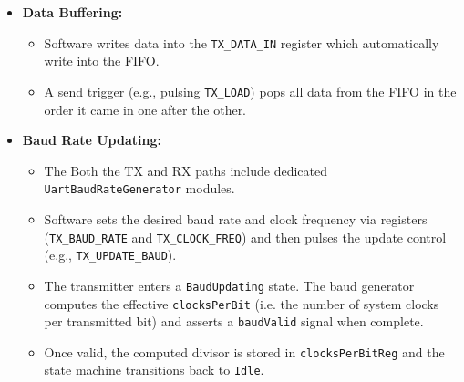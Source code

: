 \begin{itemize}
    \item \textbf{Data Buffering:} 
    \begin{itemize}
        \item Software writes data into the \texttt{TX\_DATA\_IN} register which automatically write into the FIFO.
        \item A send trigger (e.g., pulsing \texttt{TX\_LOAD}) pops all data from the FIFO in the order it came in one after the other.
    \end{itemize}
    
    \item \textbf{Baud Rate Updating:}
    \begin{itemize}
        \item The Both the TX and RX paths include dedicated \texttt{UartBaudRateGenerator} modules.
        \item Software sets the desired baud rate and clock frequency via registers (\texttt{TX\_BAUD\_RATE} and \texttt{TX\_CLOCK\_FREQ}) and then pulses the update control (e.g., \texttt{TX\_UPDATE\_BAUD}).
        \item The transmitter enters a \texttt{BaudUpdating} state. The baud generator computes the effective \texttt{clocksPerBit} (i.e. the number of system clocks per transmitted bit) and asserts a \texttt{baudValid} signal when complete.
        \item Once valid, the computed divisor is stored in \texttt{clocksPerBitReg} and the state machine transitions back to \texttt{Idle}.
    \end{itemize}
    

\end{itemize}
